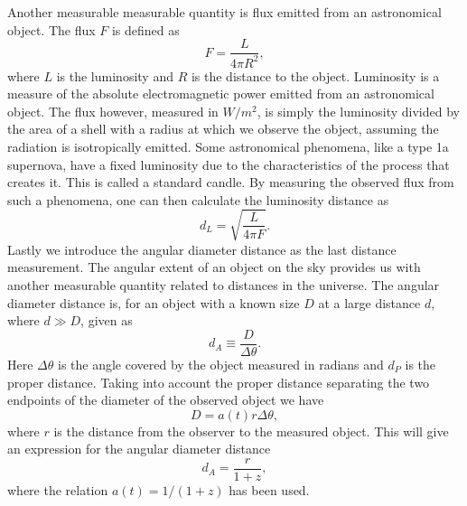 Another measurable measurable quantity is flux emitted from an astronomical object.
The flux $F$ is defined as
\begin{equation}
    F = \frac{L}{4\pi R^2},
\end{equation}
where $L$ is the luminosity and $R$ is the distance to the object. Luminosity is a measure
of the absolute electromagnetic power emitted from an astronomical object. The flux however, measured in $W/m^2$, is simply the luminosity
divided by the area of a shell with a radius at which we observe the object, assuming the radiation is isotropically emitted. Some astronomical phenomena, like a type 1a supernova, have a fixed luminosity
due to the characteristics of the process that creates it. This is called a standard candle. By measuring the observed flux from such a phenomena, one can then
calculate the luminosity distance as 
\begin{equation}
    d_L = \sqrt{\frac{L}{4\pi F}}.
\end{equation}
\indent
Lastly we introduce the angular diameter distance as the last distance
measurement. The angular extent of an object on the sky provides us with another measurable quantity related to distances in the universe. The angular diameter distance is, for an object with a known size
$D$ at a large distance $d$, where $d\gg D$, given as 
\begin{equation}
    d_A\equiv \frac{D}{\Delta\theta}.
\end{equation}
Here $\Delta\theta$ is the angle covered by the object measured in radians and $d_P$ is the proper distance. Taking into account the proper distance separating the two endpoints of the diameter of the observed object we have 
\begin{equation}
    D=a(t)r\Delta\theta,
\end{equation}
where $r$ is the distance from the observer to the measured object.
This will give an expression for the angular diameter distance
\begin{equation}
    d_A = \frac{r}{1+z},
\end{equation}
where the relation $a(t)=1/(1+z)$ has been used.
